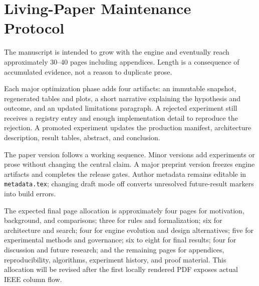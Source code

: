 \section{Living-Paper Maintenance Protocol}
The manuscript is intended to grow with the engine and eventually reach approximately 30--40 pages including appendices. Length is a consequence of accumulated evidence, not a reason to duplicate prose.

Each major optimization phase adds four artifacts: an immutable snapshot, regenerated tables and plots, a short narrative explaining the hypothesis and outcome, and an updated limitations paragraph. A rejected experiment still receives a registry entry and enough implementation detail to reproduce the rejection. A promoted experiment updates the production manifest, architecture description, result tables, abstract, and conclusion.

The paper version follows a working sequence. Minor versions add experiments or prose without changing the central claim. A major preprint version freezes engine artifacts and completes the release gates. Author metadata remains editable in \texttt{metadata.tex}; changing draft mode off converts unresolved future-result markers into build errors.

The expected final page allocation is approximately four pages for motivation, background, and comparisons; three for rules and formalization; six for architecture and search; four for engine evolution and design alternatives; five for experimental methods and governance; six to eight for final results; four for discussion and future research; and the remaining pages for appendices, reproducibility, algorithms, experiment history, and proof material. This allocation will be revised after the first locally rendered PDF exposes actual IEEE column flow.

